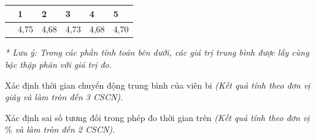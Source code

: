 \begin{center}
	\begin{longtable}{|M{4cm}|M{2cm}|M{2cm}|M{2cm}|M{2cm}|M{2cm}|}
		\hline
		&1&2&3&4&5\\
		\hline
		& 4,75 & 4,68 & 4,73 & 4,68 & 4,70\\
		\hline
	\end{longtable}
\end{center}
\textit{* Lưu ý: Trong các phần tính toán bên dưới, các giá trị trung bình được lấy cùng bậc thập phân với giá trị đo.}
\begin{ex}
Xác định thời gian chuyển động trung bình của viên bi \textit{(Kết quả tính theo đơn vị giây và làm tròn đến 3 CSCN)}.
\end{ex}
\begin{ex}
Xác định sai số tương đối trong phép đo thời gian trên \textit{(Kết quả tính theo đơn vị $\si{\percent}$ và làm tròn đến 2 CSCN)}.
\end{ex}
